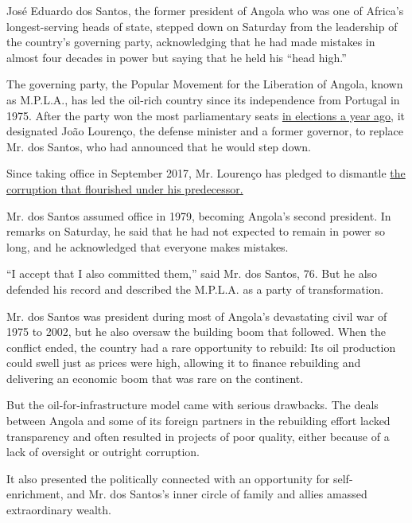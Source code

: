 José Eduardo dos Santos, the former president of Angola who was one of
Africa's longest-serving heads of state, stepped down on Saturday from
the leadership of the country's governing party, acknowledging that he
had made mistakes in almost four decades in power but saying that he
held his ``head high.''

The governing party, the Popular Movement for the Liberation of Angola,
known as M.P.L.A., has led the oil-rich country since its independence
from Portugal in 1975. After the party won the most parliamentary seats
\href{https://www.nytimes.com/2017/08/25/world/africa/angola-election-dos-santos-president-lourenco.html?action=click\&module=RelatedCoverage\&pgtype=Article\&region=Footer}{in
elections a year ago}, it designated João Lourenço, the defense minister
and a former governor, to replace Mr. dos Santos, who had announced that
he would step down.

Since taking office in September 2017, Mr. Lourenço has pledged to
dismantle
\href{https://www.nytimes.com/2017/06/24/world/africa/angola-luanda-jose-eduardo-dos-santos.html?action=click\&module=RelatedCoverage\&pgtype=Article\&region=Footer}{the
corruption that flourished under his predecessor.}

Mr. dos Santos assumed office in 1979, becoming Angola's second
president. In remarks on Saturday, he said that he had not expected to
remain in power so long, and he acknowledged that everyone makes
mistakes.

``I accept that I also committed them,'' said Mr. dos Santos, 76. But he
also defended his record and described the M.P.L.A. as a party of
transformation.

Mr. dos Santos was president during most of Angola's devastating civil
war of 1975 to 2002, but he also oversaw the building boom that
followed. When the conflict ended, the country had a rare opportunity to
rebuild: Its oil production could swell just as prices were high,
allowing it to finance rebuilding and delivering an economic boom that
was rare on the continent.

But the oil-for-infrastructure model came with serious drawbacks. The
deals between Angola and some of its foreign partners in the rebuilding
effort lacked transparency and often resulted in projects of poor
quality, either because of a lack of oversight or outright corruption.

It also presented the politically connected with an opportunity for
self-enrichment, and Mr. dos Santos's inner circle of family and allies
amassed extraordinary wealth.

